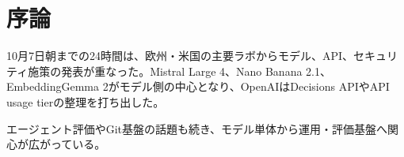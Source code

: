 \section*{序論}
10月7日朝までの24時間は、欧州・米国の主要ラボからモデル、API、セキュリティ施策の発表が重なった。Mistral Large 4、Nano Banana 2.1、EmbeddingGemma 2がモデル側の中心となり、OpenAIはDecisions APIやAPI usage tierの整理を打ち出した。

エージェント評価やGit基盤の話題も続き、モデル単体から運用・評価基盤へ関心が広がっている。
